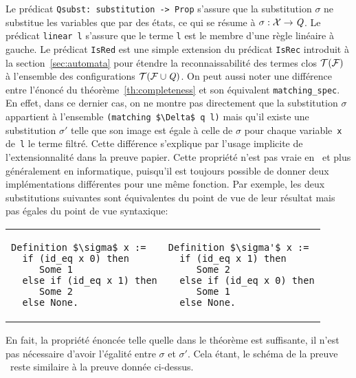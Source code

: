 Le prédicat \lstinline!Qsubst: substitution -> Prop! s'assure que la substitution 
$\sigma$ ne substitue les variables que par des états, ce qui se résume à $\sigma: \mathcal X \rightarrow \mathit Q$.
Le prédicat \lstinline!linear l! s'assure que le terme \lstinline!l! est le membre d'une règle linéaire à gauche.
Le prédicat \lstinline!IsRed! est une simple extension du prédicat \lstinline!IsRec!
introduit à la section~\ref{sec:automata} pour étendre la reconnaissabilité des termes clos
$\mathcal{T(F)}$ à l'ensemble des configurations $\mathcal{ T(F \cup \mathit Q)}$. 
On peut aussi noter une différence entre l'énoncé du théorème~\ref{th:completeness} et
son équivalent \lstinline!matching_spec!. En effet, dans ce dernier cas, on ne montre pas directement que la substitution 
$\sigma$ appartient à l'ensemble \lstinline!(matching $\Delta$ q l)! mais qu'il existe une substitution $\sigma'$
telle que son image est égale à celle de $\sigma$ pour chaque variable~\lstinline!x! de~\lstinline!l! le terme filtré.
Cette différence s'explique par l'usage implicite de l'extensionnalité dans la preuve papier. Cette propriété n'est pas vraie
en \coq\ et plus généralement en informatique, puisqu'il est toujours possible de donner deux implémentations
différentes pour une même fonction. Par exemple, les deux substitutions suivantes sont équivalentes 
du point de vue de leur résultat mais pas égales du point de vue syntaxique:
\begin{center}
  \begin{tabular}{l|l}
    \begin{minipage}{.45\linewidth}
\begin{lstlisting}
Definition $\sigma$ x :=
  if (id_eq x 0) then
     Some 1
  else if (id_eq x 1) then
     Some 2
  else None.
\end{lstlisting}
    \end{minipage}&
    \hspace{1.5cm}
    \begin{minipage}{.3\linewidth}
\begin{lstlisting}
Definition $\sigma'$ x :=
  if (id_eq x 1) then
     Some 2
  else if (id_eq x 0) then
     Some 1
  else None.
\end{lstlisting}   
    \end{minipage}
  \end{tabular}
\end{center}

En fait, la propriété énoncée telle quelle dans le théorème est suffisante, il n'est pas nécessaire
d'avoir l'égalité entre $\sigma$ et $\sigma'$. Cela étant, le schéma de la preuve \coq\ reste similaire 
à la preuve donnée ci-dessus.

